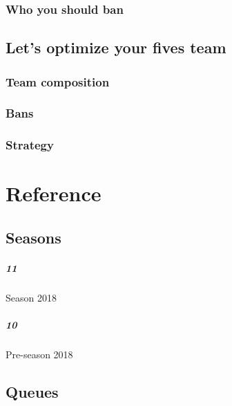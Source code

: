 \documentclass[paper=letter, landscape, oneside]{report}
\begin{document}
\subsection{Who you should ban}

\section{Let's optimize your fives team}

\subsection{Team composition}

\subsection{Bans}

\subsection{Strategy}


\chapter{Reference}

\section{Seasons}
\paragraph{11} Season 2018
\paragraph{10} Pre-season 2018

\section{Queues}
\end{document}

